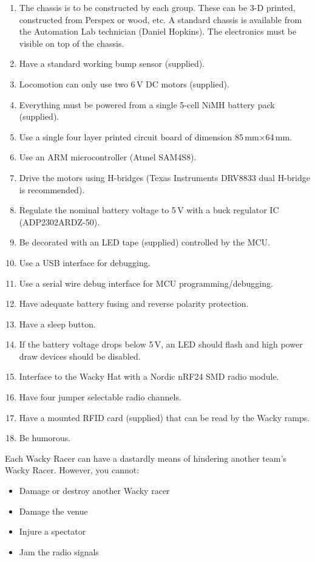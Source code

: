\documentclass[11pt, a4paper]{article}
\begin{document}
\begin{enumerate}
\item The chassis is to be constructed by each group.  These can be
  3-D printed, constructed from Perspex or wood, etc.  A standard
  chassis is available from the Automation Lab technician (Daniel
  Hopkins).  The electronics must be visible on top of the chassis.
\item Have a standard working bump sensor (supplied).
\item Locomotion can only use two 6\,V DC motors (supplied).
\item Everything must be powered from a single 5-cell NiMH battery pack (supplied).
\item Use a single four layer printed circuit board of dimension 85\,mm$\times$64\,mm.
\item Use an ARM microcontroller (Atmel SAM4S8).
\item Drive the motors using H-bridges (Texas Instruments DRV8833 dual
  H-bridge is recommended).
\item Regulate the nominal battery voltage to 5\,V with a buck
  regulator IC (ADP2302ARDZ-50).
\item Be decorated with an LED tape (supplied) controlled by the MCU.
\item Use a USB interface for debugging.
\item Use a serial wire debug interface for MCU programming/debugging.
\item Have adequate battery fusing and reverse polarity protection.
\item Have a sleep button.
\item If the battery voltage drops below 5\,V, an LED should flash and high power draw devices should be disabled.
\item Interface to the Wacky Hat with a Nordic nRF24 SMD radio module.
\item Have four jumper selectable radio channels.
\item Have a mounted RFID card (supplied) that can be read by the Wacky ramps.
\item Be humorous.
\end{enumerate}


Each Wacky Racer can have a dastardly means of hindering another
team's Wacky Racer.  However, you cannot:
%
\begin{itemize}
\item Damage or destroy another Wacky racer
\item Damage the venue
\item Injure a spectator
\item Jam the radio signals
\end{itemize}
\end{document}
